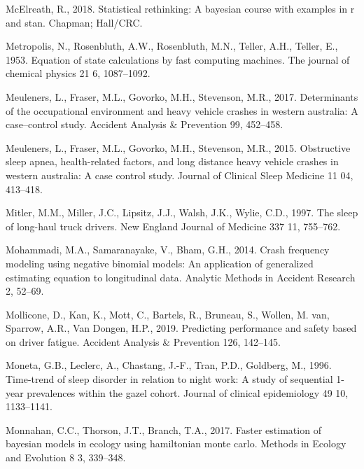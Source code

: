 \documentclass[12pt]{book}
\numberwithin{equation}{chapter}
\begin{document}
\leavevmode\hypertarget{ref-mcelreath2018statistical}{}%
McElreath, R., 2018. Statistical rethinking: A bayesian course with examples in r and stan. Chapman; Hall/CRC.

\leavevmode\hypertarget{ref-metropolis1953equation}{}%
Metropolis, N., Rosenbluth, A.W., Rosenbluth, M.N., Teller, A.H., Teller, E., 1953. Equation of state calculations by fast computing machines. The journal of chemical physics 21 6, 1087--1092.

\leavevmode\hypertarget{ref-meuleners2017determinants}{}%
Meuleners, L., Fraser, M.L., Govorko, M.H., Stevenson, M.R., 2017. Determinants of the occupational environment and heavy vehicle crashes in western australia: A case--control study. Accident Analysis \& Prevention 99, 452--458.

\leavevmode\hypertarget{ref-meuleners2015obstructive}{}%
Meuleners, L., Fraser, M.L., Govorko, M.H., Stevenson, M.R., 2015. Obstructive sleep apnea, health-related factors, and long distance heavy vehicle crashes in western australia: A case control study. Journal of Clinical Sleep Medicine 11 04, 413--418.

\leavevmode\hypertarget{ref-mitler1997sleep}{}%
Mitler, M.M., Miller, J.C., Lipsitz, J.J., Walsh, J.K., Wylie, C.D., 1997. The sleep of long-haul truck drivers. New England Journal of Medicine 337 11, 755--762.

\leavevmode\hypertarget{ref-mohammadi2014crash}{}%
Mohammadi, M.A., Samaranayake, V., Bham, G.H., 2014. Crash frequency modeling using negative binomial models: An application of generalized estimating equation to longitudinal data. Analytic Methods in Accident Research 2, 52--69.

\leavevmode\hypertarget{ref-mollicone2019predicting}{}%
Mollicone, D., Kan, K., Mott, C., Bartels, R., Bruneau, S., Wollen, M. van, Sparrow, A.R., Van Dongen, H.P., 2019. Predicting performance and safety based on driver fatigue. Accident Analysis \& Prevention 126, 142--145.

\leavevmode\hypertarget{ref-moneta1996time}{}%
Moneta, G.B., Leclerc, A., Chastang, J.-F., Tran, P.D., Goldberg, M., 1996. Time-trend of sleep disorder in relation to night work: A study of sequential 1-year prevalences within the gazel cohort. Journal of clinical epidemiology 49 10, 1133--1141.

\leavevmode\hypertarget{ref-monnahan2017faster}{}%
Monnahan, C.C., Thorson, J.T., Branch, T.A., 2017. Faster estimation of bayesian models in ecology using hamiltonian monte carlo. Methods in Ecology and Evolution 8 3, 339--348.
\end{document}
